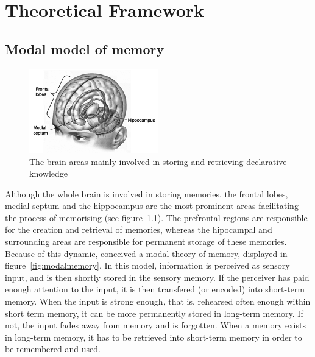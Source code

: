 \chapter{Theoretical Framework}



\section{Modal model of memory}

\begin{figure}
    \centering
    \includegraphics[width=0.5\textwidth]{img/brainareas.png}
    \caption{The brain areas mainly involved in storing and retrieving declarative knowledge \protect\cite{amnesia}}
    \label{fig:brainareas}
\end{figure}

Although the whole brain is involved in storing memories, the frontal lobes, medial septum and the hippocampus are the most prominent areas facilitating the process of memorising \cite{cognitivepsychology} (see figure~\ref{fig:brainareas}). The prefrontal regions are responsible for the creation and retrieval of memories, whereas the hipocampal and surrounding areas are responsible for permanent storage of these memories. Because of this dynamic,  conceived a modal theory of memory, displayed in figure~\ref{fig:modalmemory}. In this model, information is perceived as sensory input, and is then shortly stored in the sensory memory. If the perceiver has paid enough attention to the input, it is then transfered (or encoded) into short-term memory. When the input is strong enough, that is, rehearsed often enough within short term memory, it can be more permanently stored in long-term memory. If not, the input fades away from memory and is forgotten. When a memory exists in long-term memory, it has to be retrieved into short-term memory in order to be remembered and used.


